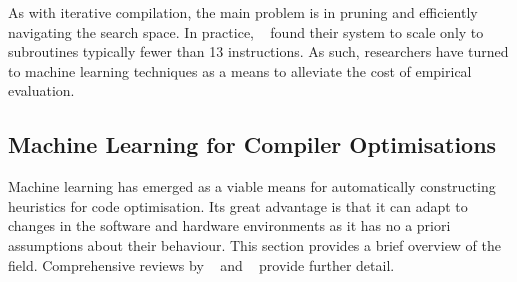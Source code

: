As with iterative compilation, the main problem is in pruning and efficiently navigating the search space. In practice, \citeauthor{Massalin1987}~\cite{Massalin1987} found their system to scale only to subroutines typically fewer than 13 instructions. As such, researchers have turned to machine learning techniques as a means to alleviate the cost of empirical evaluation.


\subsection{Machine Learning for Compiler Optimisations}
\label{subsec:related-work-machine-learning-optimisation}

Machine learning has emerged as a viable means for automatically constructing heuristics for code optimisation. Its great advantage is that it can adapt to changes in the software and hardware environments as it has no a priori assumptions about their behaviour.
This section provides a brief overview of the field. Comprehensive reviews by \citeauthor{Ashouri2018}~\cite{Ashouri2018} and
\citeauthor{Zhang2018c}~\cite{Zhang2018c} provide further detail.


